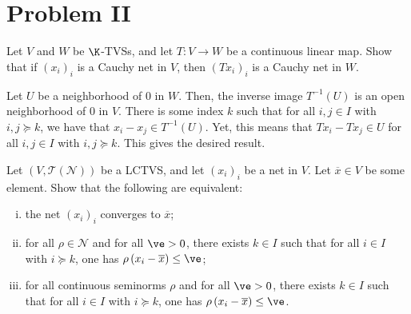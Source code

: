 \documentclass[10pt]{mypackage}
\begin{document}
\section{Problem II}%
\begin{problem}[Problem II.1]
  Let $V$ and $W$ be $\K$-TVSs, and let $T\colon V\rightarrow W$ be a continuous linear map. Show that if $\left( x_i \right)_i$ is a Cauchy net in $V$, then $\left( Tx_i \right)_i$ is a Cauchy net in $W$.
\end{problem}
\begin{solution}
  Let $U$ be a neighborhood of $0$ in $W$. Then, the inverse image $T^{-1}\left( U \right)$ is an open neighborhood of $0$ in $V$. There is some index $k$ such that for all $i,j\in I$ with $i,j\succeq k$, we have that $x_i-x_j\in T^{-1}(U)$. Yet, this means that $Tx_i - Tx_j\in U$ for all $i,j\in I$ with $i,j\succeq k$. This gives the desired result.
\end{solution}
\begin{problem}[Problem II.2]
  Let $\left( V, \mathcal{T}\left( \mathcal{N} \right) \right)$ be a LCTVS, and let $\left( x_i \right)_i$ be a net in $V$. Let $ \overline{x}\in V $ be some element. Show that the following are equivalent:
  \begin{enumerate}[(i)]
    \item the net $\left( x_i \right)_i$ converges to $ \overline{x} $;
    \item for all $\rho\in \mathcal{N}$ and for all $\ve > 0$, there exists $k\in I$ such that for all $i\in I$ with $i\succeq k$, one has $\rho\left( x_i - \overline{x} \right) \leq \ve$;
    \item for all continuous seminorms $\rho$ and for all $\ve > 0$, there exists $k\in I$ such that for all $i\in I$ with $i\succeq k$, one has $\rho\left( x_i - \overline{x} \right) \leq \ve$.
  \end{enumerate}
\end{problem}
\end{document}
